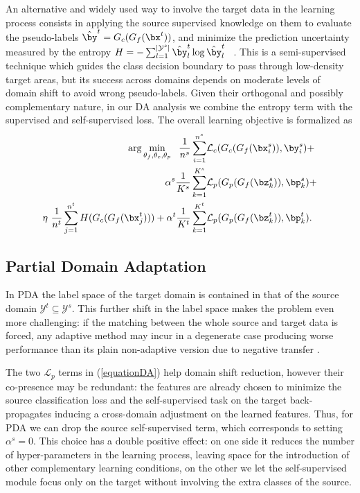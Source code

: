 {An alternative and widely used way 
to involve the target data in the learning process consists in applying the source supervised knowledge on them to evaluate the pseudo-labels $\hat{{\by}}^t=G_c(G_f({\bx}^t))$, and minimize the prediction uncertainty measured by the entropy  $H=-\sum_{l=1}^{|\mathcal{Y}^s|}\hat{\by}^t_{l} \log \hat{\by}^t_{l}$ ~\cite{mancini2018boosting,featurenorm_PDA}. This is a semi-supervised technique which guides the class decision boundary to pass through 
low-density target areas, but its success across domains depends on moderate levels of domain shift to avoid wrong pseudo-labels.
}
{Given their orthogonal and possibly complementary nature, in our DA analysis we combine the entropy term with the supervised and self-supervised loss.}
The overall learning objective is formalized as \vspace{-1mm}
\begin{align} \small
    \arg \min_{\theta_f, \theta_c, \theta_p} ~~  
    \frac{1}{n^s} \sum_{i=1}^{n^s}   & \mathcal{L}_c(G_c(G_f(\bx^s_i)),\by_i^s) + \nonumber \\
    \alpha^s \frac{1}{K^s}\sum_{k=1}^{K^s} & \mathcal{L}_p(G_p(G_f(\bz^s_k)),\bp_k^s) +  \nonumber \\
    \eta~\frac{1}{n^t} \sum_{j=1}^{n^t}  H(G_c(G_f(\bx^t_j))) + 
   \alpha^t \frac{1}{K^t} \sum_{k=1}^{K^t} & \mathcal{L}_p(G_p(G_f(\bz^t_k)),\bp_k^t) .
    \label{equationDA}
\end{align}

\subsection{Partial Domain Adaptation}
\label{subsec:PDA}
In PDA the label space of the target domain is contained in that of the source domain $\mathcal{Y}^t \subseteq \mathcal{Y}^s$. This further shift in the label space makes the problem even more challenging: 
if the matching between the whole source and target data is forced, any adaptive method may incur in a degenerate case producing worse performance than its plain non-adaptive version due to negative transfer \cite{Rosenstein05totransfer}. 

The two $\mathcal{L}_p$ terms in (\ref{equationDA}) help domain shift reduction, however their co-presence may be redundant: the features are already chosen to minimize the 
source classification loss and the self-supervised task on the target back-propagates inducing a cross-domain adjustment on the learned features. Thus, for PDA we can drop the source self-supervised term, which corresponds to setting $\alpha^s=0$. This choice has a double positive effect: on one side it reduces the number of hyper-parameters in the learning process, leaving space for the introduction of other complementary learning conditions, on the other we let the self-supervised module focus only on the target without involving the extra classes of the source. 

